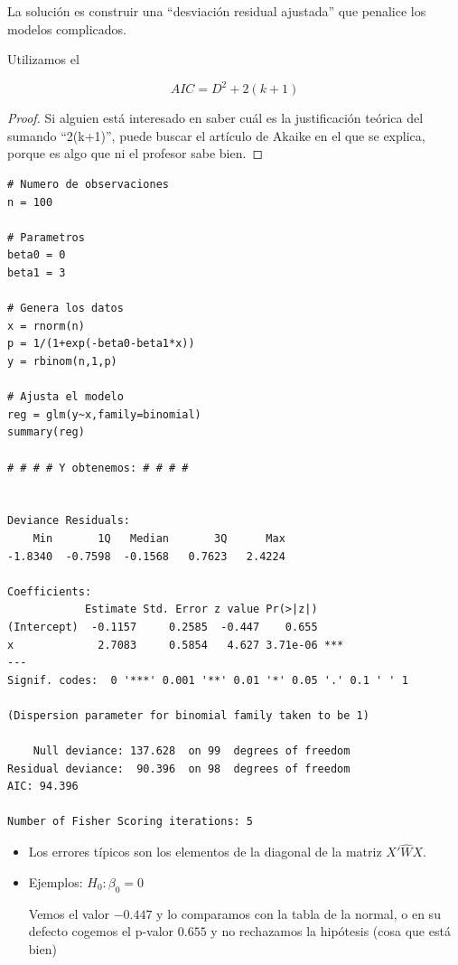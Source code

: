 \begin{enumerate}
  La solución es construir una ``desviación residual ajustada'' que penalice los modelos complicados.

  \subitem Utilizamos el  

    \[AIC = D^2 + 2(k+1)\]

    \begin{proof}
      Si alguien está interesado en saber cuál es la justificación teórica del sumando ``2(k+1)'', puede buscar el artículo de Akaike en el que se explica, porque es algo que ni el profesor sabe bien.
    \end{proof}
\end{enumerate}

\begin{example}

\begin{lstlisting}[style=mystyle]
# Numero de observaciones
n = 100

# Parametros
beta0 = 0
beta1 = 3

# Genera los datos
x = rnorm(n)
p = 1/(1+exp(-beta0-beta1*x))
y = rbinom(n,1,p)

# Ajusta el modelo
reg = glm(y~x,family=binomial)
summary(reg)

# # # # Y obtenemos: # # # #


Deviance Residuals:
    Min       1Q   Median       3Q      Max
-1.8340  -0.7598  -0.1568   0.7623   2.4224

Coefficients:
            Estimate Std. Error z value Pr(>|z|)
(Intercept)  -0.1157     0.2585  -0.447    0.655
x             2.7083     0.5854   4.627 3.71e-06 ***
---
Signif. codes:  0 '***' 0.001 '**' 0.01 '*' 0.05 '.' 0.1 ' ' 1

(Dispersion parameter for binomial family taken to be 1)

    Null deviance: 137.628  on 99  degrees of freedom
Residual deviance:  90.396  on 98  degrees of freedom
AIC: 94.396

Number of Fisher Scoring iterations: 5

\end{lstlisting}

\begin{itemize}
  \item Los errores típicos son los elementos de la diagonal de la matriz $X'\hat{W}X$.
  \item Ejemplos:
  \subitem $H_0 : β_0 = 0$

  Vemos el valor $-0.447$ y lo comparamos con la tabla de la normal, o en su defecto cogemos el p-valor $0.655$ y no rechazamos la hipótesis (cosa que está bien)


\end{itemize}
\end{example}
